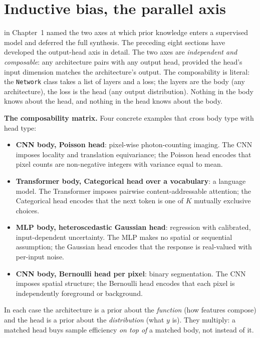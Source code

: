 
\section{Inductive bias, the parallel axis}\label{sec:parallel-axes}

 in Chapter~1 named the two axes at which
prior knowledge enters a supervised model and deferred the full synthesis.
The preceding eight sections have developed the output-head axis in
detail. The two axes are \emph{independent and composable}: any
architecture pairs with any output head, provided the head's input
dimension matches the architecture's output. The composability is
literal: the \texttt{Network} class takes a list of layers and a loss;
the layers are the body (any architecture), the loss is the head (any
output distribution). Nothing in the body knows about the head, and
nothing in the head knows about the body.

\textbf{The composability matrix.} Four concrete examples that cross
body type with head type:

\begin{itemize}
\item \textbf{CNN body, Poisson head}: pixel-wise photon-counting
  imaging. The CNN imposes locality and translation equivariance; the
  Poisson head encodes that pixel counts are non-negative integers with
  variance equal to mean.
\item \textbf{Transformer body, Categorical head over a vocabulary}: a
  language model. The Transformer imposes pairwise content-addressable
  attention; the Categorical head encodes that the next token is one of
  $K$ mutually exclusive choices.
\item \textbf{MLP body, heteroscedastic Gaussian head}: regression with
  calibrated, input-dependent uncertainty. The MLP makes no spatial or
  sequential assumption; the Gaussian head encodes that the response is
  real-valued with per-input noise.
\item \textbf{CNN body, Bernoulli head per pixel}: binary segmentation.
  The CNN imposes spatial structure; the Bernoulli head encodes that
  each pixel is independently foreground or background.
\end{itemize}

In each case the architecture is a prior about the \emph{function}
(how features compose) and the head is a prior about the
\emph{distribution} (what $y$ is). They multiply: a matched head buys
sample efficiency \emph{on top of} a matched body, not instead of it.

